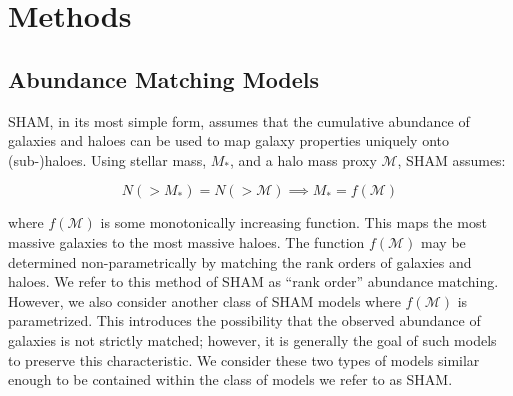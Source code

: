 \documentclass[a4paper,fleqn,usenatbib]{mnras}
\begin{document}
\section{Methods}

\subsection{Abundance Matching Models}

SHAM, in its most simple form, assumes that the cumulative abundance of galaxies and haloes can be used to map galaxy properties uniquely onto (sub-)haloes.  Using stellar mass, $M_{*}$, and a halo mass proxy $\mathcal{M}$, SHAM assumes:
%
\begin{linenomath}
\begin{equation}
\label{eq:sham}
N(>M_*) = N(>\mathcal{M}) \implies M_{*} = f(\mathcal{M})
\end{equation} 
\end{linenomath}
%
where $f(\mathcal{M})$ is some monotonically increasing function.  This maps the most massive galaxies to the most massive haloes.  The function $f(\mathcal{M})$ may be determined non-parametrically by matching the rank orders of galaxies and haloes.  We refer to this method of SHAM as ``rank order'' abundance matching.  However, we also consider another class of SHAM models where $f(\mathcal{M})$ is parametrized.  This introduces the possibility that the observed abundance of galaxies is not strictly matched; however, it is generally the goal of such models to preserve this characteristic.  We consider these two types of models similar enough to be contained within the class of models we refer to as SHAM.
\end{document}
